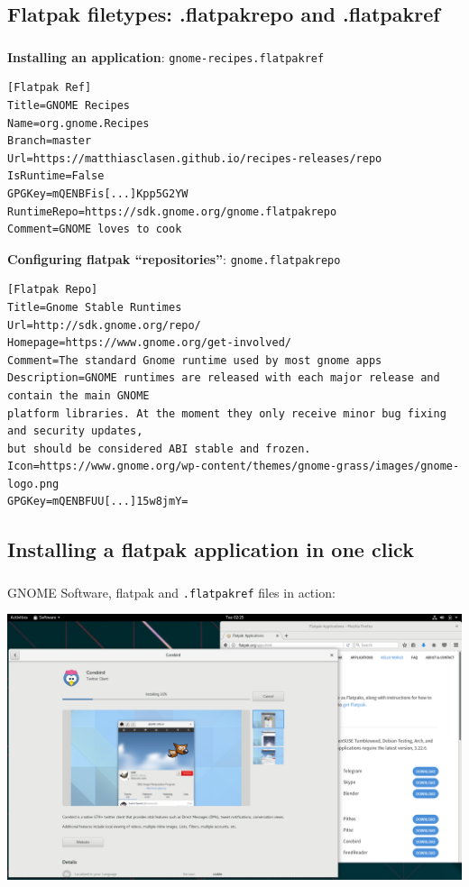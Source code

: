 \subsection{Flatpak filetypes: .flatpakrepo and .flatpakref}
\begin{frame}[fragile]
  \frametitle{\insertsubsection}

  \textbf{Installing an application}: \texttt{gnome-recipes.flatpakref}
  \begin{tiny}
\begin{verbatim}
[Flatpak Ref]
Title=GNOME Recipes
Name=org.gnome.Recipes
Branch=master
Url=https://matthiasclasen.github.io/recipes-releases/repo
IsRuntime=False
GPGKey=mQENBFis[...]Kpp5G2YW
RuntimeRepo=https://sdk.gnome.org/gnome.flatpakrepo
Comment=GNOME loves to cook
\end{verbatim}
  \end{tiny}

  \textbf{Configuring flatpak ``repositories''}: \texttt{gnome.flatpakrepo}
  \begin{tiny}
\begin{verbatim}
[Flatpak Repo]
Title=Gnome Stable Runtimes
Url=http://sdk.gnome.org/repo/
Homepage=https://www.gnome.org/get-involved/
Comment=The standard Gnome runtime used by most gnome apps
Description=GNOME runtimes are released with each major release and contain the main GNOME
platform libraries. At the moment they only receive minor bug fixing and security updates,
but should be considered ABI stable and frozen.
Icon=https://www.gnome.org/wp-content/themes/gnome-grass/images/gnome-logo.png
GPGKey=mQENBFUU[...]15w8jmY=
\end{verbatim}
  \end{tiny}

\end{frame}

\subsection{Installing a flatpak application in one click}
\begin{frame}[fragile]
  \frametitle{\insertsubsection}

  GNOME Software, flatpak and \texttt{.flatpakref} files in action:
  \begin{center}
    \includegraphics[width=1\textwidth]{images/corebird.png}
  \end{center}

\end{frame}
